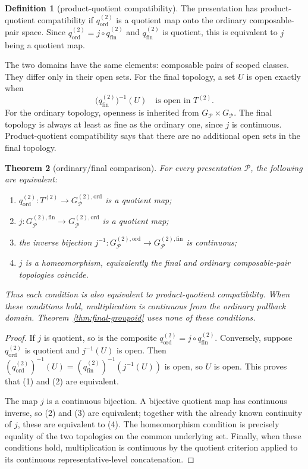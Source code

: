\documentclass[10pt,reqno]{amsart}
\theoremstyle{definition}
\newtheorem{definition}{Definition}[section]
\theoremstyle{plain}
\newtheorem{theorem}[definition]{Theorem}
\theoremstyle{remark}
\newcommand{\Fin}{\mathrm{fin}}
\newcommand{\Ord}{\mathrm{ord}}
\begin{document}
\begin{definition}[product-quotient compatibility]
The presentation has product-quotient compatibility if $q_{\Ord}^{(2)}$ is a
quotient map onto the ordinary composable-pair space.  Since
$q_{\Ord}^{(2)}=j\circ q_{\Fin}^{(2)}$ and $q_{\Fin}^{(2)}$ is quotient, this
is equivalent to $j$ being a quotient map.
\end{definition}

The two domains have the same elements: composable pairs of scoped classes.
They differ only in their open sets.  For the final topology, a set $U$ is
open exactly when
\[
  \bigl(q_{\Fin}^{(2)}\bigr)^{-1}(U)
  \quad\text{is open in }T^{(2)}.
\]
For the ordinary topology, openness is inherited from
$G_{\mathcal P}\times G_{\mathcal P}$.
The final topology is always at least as fine as the ordinary one, since
$j$ is continuous.  Product-quotient compatibility says that there are no
additional open sets in the final topology.



\begin{theorem}[ordinary/final comparison]
\label{thm:ordinary-final}
For every presentation $\mathcal P$, the following are equivalent:
\begin{enumerate}[label=(\arabic*),leftmargin=2.2em]
\item $q_{\Ord}^{(2)}:T^{(2)}\to G_{\mathcal P}^{(2),\Ord}$ is a quotient map;
\item $j:G_{\mathcal P}^{(2),\Fin}\to G_{\mathcal P}^{(2),\Ord}$ is a
  quotient map;
\item the inverse bijection $j^{-1}:G_{\mathcal P}^{(2),\Ord}\to
  G_{\mathcal P}^{(2),\Fin}$ is continuous;
\item $j$ is a homeomorphism, equivalently the final and ordinary
  composable-pair topologies coincide.
\end{enumerate}
Thus each condition is also equivalent to product-quotient compatibility.
When these conditions hold, multiplication is continuous from the ordinary
pullback domain.  Theorem~\ref{thm:final-groupoid} uses none of these
conditions.
\end{theorem}

\begin{proof}
If $j$ is quotient, so is the composite $q_{\Ord}^{(2)}=j\circ q_{\Fin}^{(2)}$.
Conversely, suppose $q_{\Ord}^{(2)}$ is quotient and $j^{-1}(U)$ is open.  Then
$(q_{\Ord}^{(2)})^{-1}(U)=(q_{\Fin}^{(2)})^{-1}(j^{-1}(U))$ is open, so $U$ is
open.  This proves that (1) and (2) are equivalent.

The map $j$ is a continuous bijection.  A bijective quotient map has
continuous inverse, so (2) and (3) are equivalent; together with the already
known continuity of $j$, these are equivalent to (4).  The homeomorphism
condition is precisely equality of the two topologies on the common
underlying set.  Finally, when these conditions hold, multiplication is
continuous by the quotient criterion applied to its continuous
representative-level concatenation.
\end{proof}
\end{document}
